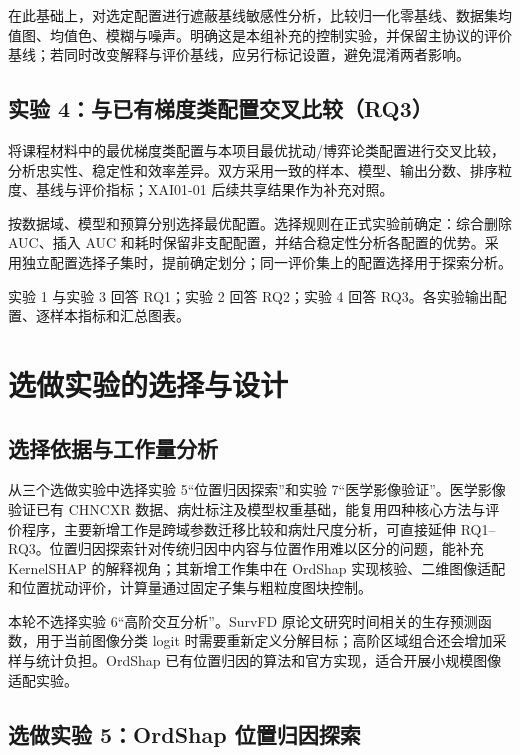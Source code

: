 在此基础上，对选定配置进行遮蔽基线敏感性分析，比较归一化零基线、数据集均值图、均值色、模糊与噪声。明确这是本组补充的控制实验，并保留主协议的评价基线；若同时改变解释与评价基线，应另行标记设置，避免混淆两者影响。

\subsection{实验 4：与已有梯度类配置交叉比较（RQ3）}

将课程材料中的最优梯度类配置与本项目最优扰动/博弈论类配置进行交叉比较，分析忠实性、稳定性和效率差异。双方采用一致的样本、模型、输出分数、排序粒度、基线与评价指标；XAI01-01 后续共享结果作为补充对照。

按数据域、模型和预算分别选择最优配置。选择规则在正式实验前确定：综合删除 AUC、插入 AUC 和耗时保留非支配配置，并结合稳定性分析各配置的优势。采用独立配置选择子集时，提前确定划分；同一评价集上的配置选择用于探索分析。

实验 1 与实验 3 回答 RQ1；实验 2 回答 RQ2；实验 4 回答 RQ3。各实验输出配置、逐样本指标和汇总图表。

\section{选做实验的选择与设计}

\subsection{选择依据与工作量分析}

从三个选做实验中选择实验 5“位置归因探索”和实验 7“医学影像验证”。医学影像验证已有 CHNCXR 数据、病灶标注及模型权重基础，能复用四种核心方法与评价程序，主要新增工作是跨域参数迁移比较和病灶尺度分析，可直接延伸 RQ1--RQ3。位置归因探索针对传统归因中内容与位置作用难以区分的问题，能补充 KernelSHAP 的解释视角；其新增工作集中在 OrdShap 实现核验、二维图像适配和位置扰动评价，计算量通过固定子集与粗粒度图块控制。

本轮不选择实验 6“高阶交互分析”。SurvFD 原论文研究时间相关的生存预测函数\cite{langbein2026survfd}，用于当前图像分类 logit 时需要重新定义分解目标；高阶区域组合还会增加采样与统计负担。OrdShap 已有位置归因的算法和官方实现\cite{hill2025ordshap}，适合开展小规模图像适配实验。

\subsection{选做实验 5：OrdShap 位置归因探索}

